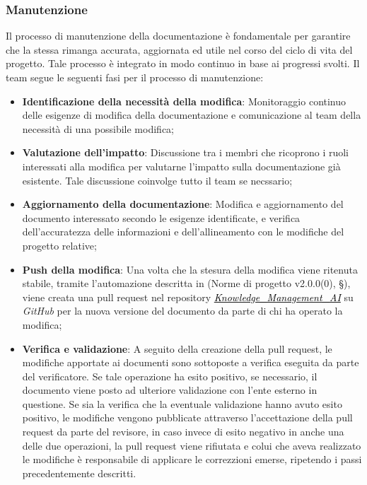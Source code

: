 \documentclass[10pt, a4paper]{article}
\begin{document}
\subsubsection{Manutenzione}
Il processo di manutenzione della documentazione è fondamentale per garantire che la stessa rimanga accurata, aggiornata ed utile nel corso del ciclo di vita del progetto. Tale processo è integrato in modo continuo in base ai progressi svolti. Il team segue le seguenti fasi per il processo di manutenzione:
\begin{itemize}
    \item \textbf{Identificazione della necessità della modifica}: Monitoraggio continuo delle esigenze di modifica della documentazione e 
    comunicazione al team della necessità di una possibile modifica;
    \item \textbf{Valutazione dell'impatto}: Discussione tra i membri che ricoprono i ruoli interessati alla modifica per valutarne l'impatto 
    sulla documentazione già esistente. Tale discussione coinvolge tutto il team se necssario;
    \item \textbf{Aggiornamento della documentazione}: Modifica e aggiornamento del documento interessato secondo le esigenze identificate, e 
    verifica dell'accuratezza delle informazioni e dell'allineamento con le modifiche del progetto relative;
    \item \textbf{Push della modifica}: Una volta che la stesura della modifica viene ritenuta stabile, tramite l'automazione descritta in 
    (Norme di progetto v2.0.0(0), \S {}),
    viene creata una pull request nel repository \href{https://github.com/sweetcode-team/Knowledge_Management_AI}{\textcolor{black}{\textit{Knowledge\_Management\_AI}}} 
    su \textit{GitHub} per la nuova versione del documento da parte di chi ha operato la modifica;
    \item \textbf{Verifica e validazione}: A seguito della creazione della pull request, le modifiche apportate ai documenti sono sottoposte a
    verifica eseguita da parte del verificatore. Se tale operazione ha esito positivo, se necessario, il documento viene posto ad ulteriore validazione con l'ente esterno in questione.
    Se sia la verifica che la eventuale validazione hanno avuto esito positivo, le modifiche vengono pubblicate attraverso l'accettazione della 
    pull request da parte del revisore, in caso invece di esito negativo in anche una delle due operazioni, la pull request viene rifiutata e colui 
    che aveva realizzato le modifiche è responsabile di applicare le correzzioni emerse, ripetendo i passi precedentemente descritti.
\end{itemize}
\end{document}
